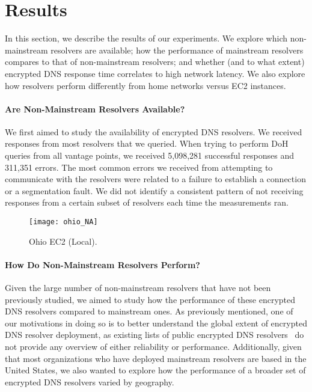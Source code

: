 \section{Results}\label{sec:results} 

In this section, we describe the results of our experiments.  We explore which
non-mainstream resolvers are available; how
the performance of mainstream resolvers compares to that of non-mainstream
resolvers; and whether (and to what extent) encrypted DNS response time
correlates to high network latency. We also explore how resolvers perform 
differently from home networks versus EC2 instances. 

\paragraph{Are Non-Mainstream Resolvers Available?}
We first aimed to study the availability of encrypted DNS
resolvers. 
We received responses from most resolvers that we queried. When trying to perform DoH queries from all vantage points,
we received 5,098,281 successful responses and 311,351 errors. 
The most common errors we received from attempting to communicate with
the resolvers were related to a failure to establish a connection or a segmentation fault.
We did not identify a consistent pattern of not receiving responses from a certain
subset of resolvers each time the measurements ran. 


\begin{figure}[h!]
\texttt{[image: ohio\_NA]}
\caption{Ohio EC2 (Local).}
    \label{fig:dns-us-ohio}
\end{figure}


\paragraph{How Do Non-Mainstream Resolvers Perform?}
Given the large number of non-mainstream resolvers that have not been
previously studied, we aimed to study how
the performance of these encrypted DNS resolvers compared to mainstream ones.
As previously mentioned, one of our motivations in doing so is to better
understand the global extent of encrypted DNS resolver deployment, as existing
lists of public encrypted DNS resolvers~\cite{dnscrypt-public-resolvers} do
not provide any overview of either reliability or performance. Additionally,
given that most organizations who have deployed mainstream resolvers are based
in the United States, we also wanted to explore how the performance of a
broader set of encrypted DNS resolvers varied by geography.

